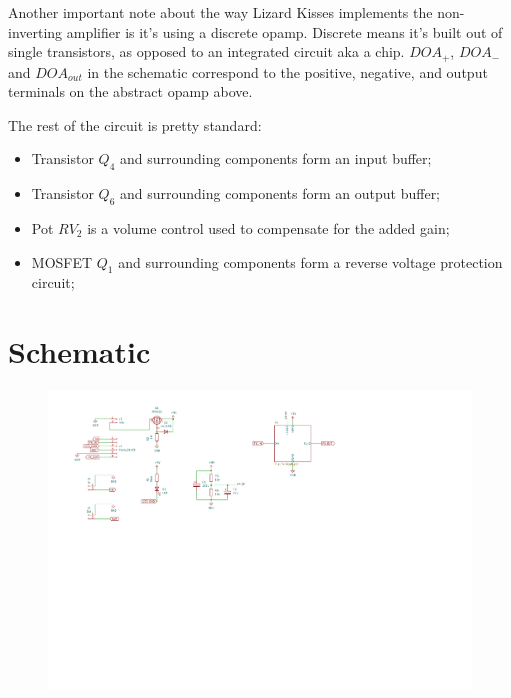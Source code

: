 \documentclass[a4paper,12pt]{article}
\begin{document}
Another important note about the way Lizard Kisses
implements the non-inverting amplifier is it's using a
discrete opamp. Discrete means it's built out of single
transistors, as opposed to an integrated circuit aka a chip.
$DOA_+$, $DOA_-$ and $DOA_{out}$ in the schematic correspond
to the positive, negative, and output terminals on the
abstract opamp above.

The rest of the circuit is pretty standard:

\begin{itemize}
  \item Transistor $Q_4$ and surrounding components form an
    input buffer;
  \item Transistor $Q_6$ and surrounding components form an
    output buffer;
  \item Pot $RV_2$ is a volume control used to compensate
    for the added gain;
  \item MOSFET $Q_1$ and surrounding components form a
    reverse voltage protection circuit;
\end{itemize}

\pagebreak

\section{Schematic}
\label{sec:schematic}

\begin{figure}[h!]
  \centering
  \includegraphics[width=1.3\textwidth, trim={0 10cm 6cm 0cm}, clip, angle=-90]{schem.pdf}
\end{figure}
\end{document}
